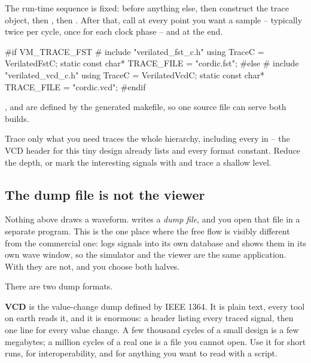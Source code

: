 The run-time sequence is fixed:  before anything else,
then construct the trace object, then , then
. After that, call  at every point
you want a sample -- typically twice per cycle, once for each clock phase --
and  at the end.

\begin{cppcode}
#if VM_TRACE_FST
# include "verilated_fst_c.h"
using TraceC = VerilatedFstC;
static const char* TRACE_FILE = "cordic.fst";
#else
# include "verilated_vcd_c.h"
using TraceC = VerilatedVcdC;
static const char* TRACE_FILE = "cordic.vcd";
#endif
\end{cppcode}

,  and  are defined by
the generated makefile, so one source file can serve both builds.

\begin{tipbox}{Trace only what you need}
 traces the whole hierarchy, including every
 in  -- the VCD header for this tiny design
already lists  and every format constant. Reduce the
depth, or mark the interesting signals with 
and trace a shallow level.
\end{tipbox}

\subsection{The dump file is not the viewer}
\label{sec:verilator:viewers}

Nothing above draws a
waveform.  writes a \emph{dump file}, and you open that file in
a separate program. This is the one place where the free flow is visibly
different from the commercial one:  logs signals into its own
 database and shows them in its own wave window, so the simulator
and the viewer are the same application. With  they are not,
and you choose both halves.

There are two dump formats.

\textbf{VCD} is the value-change dump defined by IEEE 1364. It is plain text,
every tool on earth reads it, and it is enormous: a header listing every traced
signal, then one line for every value change. A few thousand cycles of a small
design is a few megabytes; a million cycles of a real one is a file you cannot
open. Use it for short runs, for interoperability, and for anything you want to
read with a script.


